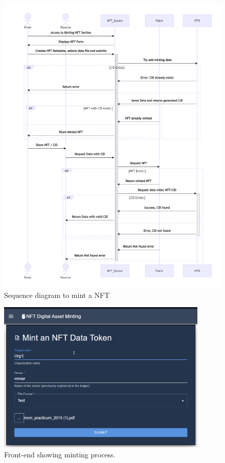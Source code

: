  \begin{figure}[!h]
        \includegraphics[width=15cm]{img/SequenceDiagram_MintNFT.png}
        \caption{Sequence diagram to mint a \ac{NFT}}
        \label{fig:SeqDiag_Mint}
    \end{figure}
    
 \begin{figure}[!h]
        \centering
        \includegraphics[width=10cm]{img/UIMinting.png}
        \caption{Front-end showing minting process.}
        \label{fig:UI_Mint}
    \end{figure}

